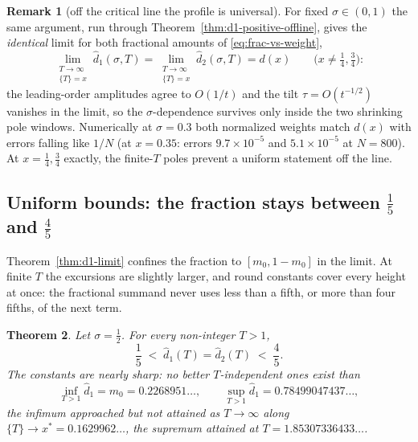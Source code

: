 \documentclass[11pt]{article}
\newtheorem{theorem}{Theorem}[section]
\theoremstyle{definition}
\newtheorem{remark}[theorem]{Remark}
\begin{document}
\begin{remark}[off the critical line the profile is universal]
For fixed $\sigma\in(0,1)$ the same argument, run through
Theorem~\ref{thm:d1-positive-offline}, gives the \emph{identical} limit for
both fractional amounts of \eqref{eq:frac-vs-weight},
\[
\lim_{\substack{T\to\infty\\ \{T\}=x}}\hat d_1(\sigma,T)
=\lim_{\substack{T\to\infty\\ \{T\}=x}}\hat d_2(\sigma,T)
= d(x)
\qquad\bigl(x\neq\tfrac14,\tfrac34\bigr):
\]
the leading-order amplitudes agree to $O(1/t)$ and the tilt
$\tau=O(t^{-1/2})$ vanishes in the limit, so the $\sigma$-dependence
survives only inside the two shrinking pole windows. Numerically at
$\sigma=0.3$ both normalized weights match $d(x)$ with errors falling like
$1/N$ (at $x=0.35$: errors $9.7\times10^{-5}$ and $5.1\times10^{-5}$ at
$N=800$). At $x=\tfrac14,\tfrac34$ exactly, the finite-$T$ poles prevent a
uniform statement off the line.
\end{remark}

\subsection{Uniform bounds: the fraction stays between \texorpdfstring{$\tfrac15$ and $\tfrac45$}{1/5 and 4/5}}\label{sec:d1-bounds}

Theorem~\ref{thm:d1-limit} confines the fraction to $[m_0,1-m_0]$ in the
limit. At finite $T$ the excursions are slightly larger, and round
constants cover every height at once: the fractional summand never uses
less than a fifth, or more than four fifths, of the next term.

\begin{theorem}\label{thm:d1-bounds}
Let $\sigma=\tfrac12$. For every non-integer $T>1$,
\[
\frac15\;<\;\hat d_1(T)=\hat d_2(T)\;<\;\frac45 .
\]
The constants are nearly sharp: no better $T$-independent ones exist than
\[
\inf_{T>1}\hat d_1=m_0=0.2268951\ldots,
\qquad
\sup_{T>1}\hat d_1=0.78499047437\ldots,
\]
the infimum approached but not attained as $T\to\infty$ along
$\{T\}\to x^{*}=0.1629962\ldots$, the supremum attained at
$T=1.85307336433\ldots$.
\end{theorem}
\end{document}
